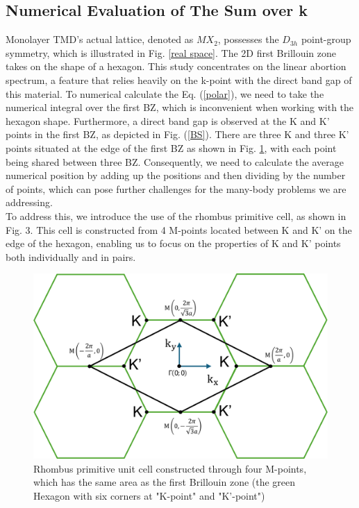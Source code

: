 \documentclass[12pt,english,a4paper]{article}
\begin{document}
\subsection{Numerical Evaluation of The Sum over k}
\quad Monolayer TMD's actual lattice, denoted as $MX_2$, possesses the $D_{3h}$ point-group symmetry, which is illustrated in Fig. \ref{real space}. The 2D first Brillouin zone takes on the shape of a hexagon. This study concentrates on the linear abortion spectrum, a feature that relies heavily on the k-point with the direct band gap of this material. To numerical calculate the Eq. (\ref{polar}), we need to take the numerical integral over the first BZ, which is inconvenient when working with the hexagon shape. Furthermore, a direct band gap is observed at the K and K' points in the first BZ, as depicted in Fig. (\ref{BS}). There are three K and three K' points situated at the edge of the first BZ as shown in Fig. \ref{Rhombus}, with each point being shared between three BZ. Consequently, we need to calculate the average numerical position by adding up the positions and then dividing by the number of points, which can pose further challenges for the many-body problems we are addressing.\\\null
\quad To address this, we introduce the use of the rhombus primitive cell, as shown in Fig. 3. This cell is constructed from 4 M-points located between K and K' on the edge of the hexagon, enabling us to focus on the properties of K and K' points both individually and in pairs.
\begin{figure}[h]
	\begin{center}
		\includegraphics[width= 0.6\linewidth]{Images/Rhombus.pdf}
		\caption[Rhombus primitive unit cell in comparison with hexagon primitive unit cell (the first Brillouin zone)]{Rhombus primitive unit cell constructed through four M-points, which has the same area as the first Brillouin zone (the green Hexagon with six corners at "K-point" and "K'-point")}
		\label{Rhombus}
	\end{center}
\end{figure}\null
\end{document}
